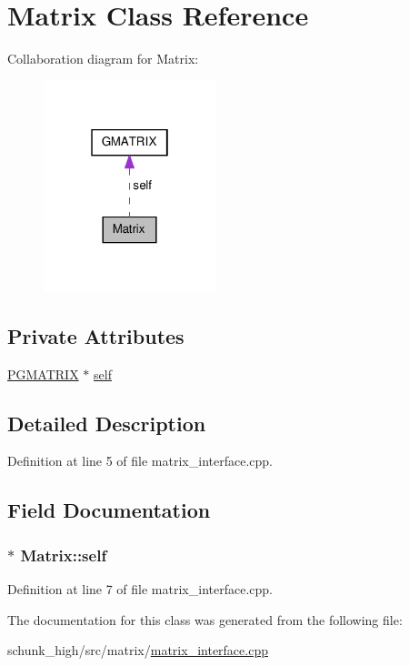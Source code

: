 \hypertarget{classMatrix}{\section{Matrix Class Reference}
\label{classMatrix}
}


Collaboration diagram for Matrix\-:\nopagebreak
\begin{figure}[H]
\begin{center}
\leavevmode
\includegraphics[width=142pt]{classMatrix__coll__graph}
\end{center}
\end{figure}
\subsection*{Private Attributes}
\begin{DoxyCompactItemize}
\item 
\hyperlink{gmatrix_8h_ad8edc274a17feb9e4fca93e620253bed}{P\-G\-M\-A\-T\-R\-I\-X} $\ast$ \hyperlink{classMatrix_a3cd31e02b5127a4a926add88d0d9ec63}{self}
\end{DoxyCompactItemize}


\subsection{Detailed Description}


Definition at line 5 of file matrix\-\_\-interface.\-cpp.



\subsection{Field Documentation}
\hypertarget{classMatrix_a3cd31e02b5127a4a926add88d0d9ec63}{
\subsubsection[{self}]{$\ast$ Matrix\-::self\hspace{0.3cm}{\ttfamily [private]}}}\label{classMatrix_a3cd31e02b5127a4a926add88d0d9ec63}


Definition at line 7 of file matrix\-\_\-interface.\-cpp.



The documentation for this class was generated from the following file\-:\begin{DoxyCompactItemize}
\item 
schunk\-\_\-high/src/matrix/\hyperlink{matrix__interface_8cpp}{matrix\-\_\-interface.\-cpp}\end{DoxyCompactItemize}
